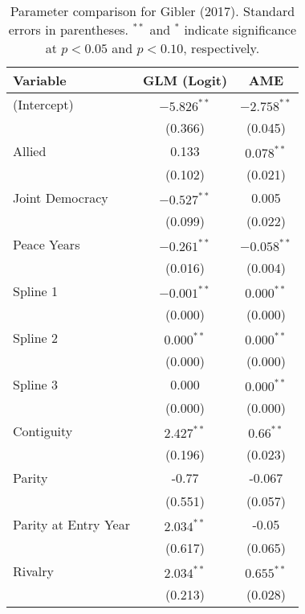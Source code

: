 \begin{table}[ht]
\centering
\begingroup\normalsize
\begin{tabular}{lcc}
 Variable & GLM (Logit) & AME \\ 
  \hline
\hline
(Intercept) & $-5.826^{\ast\ast}$ & $-2.758^{\ast\ast}$ \\ 
   & (0.366) & (0.045) \\ 
  Allied & 0.133 & $0.078^{\ast\ast}$ \\ 
   & (0.102) & (0.021) \\ 
  Joint Democracy & $-0.527^{\ast\ast}$ & 0.005 \\ 
   & (0.099) & (0.022) \\ 
  Peace Years & $-0.261^{\ast\ast}$ & $-0.058^{\ast\ast}$ \\ 
   & (0.016) & (0.004) \\ 
  Spline 1 & $-0.001^{\ast\ast}$ & $0.000^{\ast\ast}$ \\ 
   & (0.000) & (0.000) \\ 
  Spline 2 & $0.000^{\ast\ast}$ & $0.000^{\ast\ast}$ \\ 
   & (0.000) & (0.000) \\ 
  Spline 3 & 0.000 & $0.000^{\ast\ast}$ \\ 
   & (0.000) & (0.000) \\ 
  Contiguity & $2.427^{\ast\ast}$ & $0.66^{\ast\ast}$ \\ 
   & (0.196) & (0.023) \\ 
  Parity & -0.77 & -0.067 \\ 
   & (0.551) & (0.057) \\ 
  Parity at Entry Year & $2.034^{\ast\ast}$ & -0.05 \\ 
   & (0.617) & (0.065) \\ 
  Rivalry & $2.034^{\ast\ast}$ & $0.655^{\ast\ast}$ \\ 
   & (0.213) & (0.028) \\ 
   \hline
\hline
\end{tabular}
\endgroup
\caption{Parameter comparison for Gibler (2017). Standard errors in parentheses. $^{**}$ and $^{*}$ indicate significance at $p<0.05$ and $p<0.10$, respectively.} 
\label{tab:gibler_coef}
\end{table}
